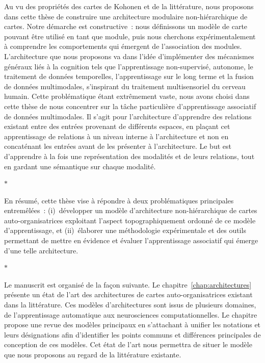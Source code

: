 Au vu des propriétés des cartes de Kohonen et de la littérature, nous proposons dans cette thèse de construire une architecture modulaire non-hiérarchique de cartes.
Notre démarche est constructive~: nous définissons un modèle de carte pouvant être utilisé en tant que module, puis nous cherchons expérimentalement à comprendre les comportements qui émergent de l'association des modules.
L'architecture que nous proposons va dans l'idée d'implémenter des mécanismes généraux liés à la cognition tels que l'apprentissage non-supervisé, autonome, le traitement de données temporelles, l'apprentissage sur le long terme et la fusion de données multimodales, s'inspirant du traitement multisensoriel du cerveau humain.
Cette problématique étant extrêmement vaste, nous avons choisi dans cette thèse de nous concentrer sur la tâche particulière d'apprentissage associatif de données multimodales. 
Il s'agit pour l'architecture d'apprendre des relations existant entre des entrées provenant de différents espaces, en plaçant cet apprentissage de relations à un niveau interne à l'architecture et non en concaténant les entrées avant de les présenter à l'architecture. Le but est d'apprendre à la fois une représentation des modalités et de leurs relations, tout en gardant une sémantique sur chaque modalité.

\begin{center}
  $\ast$
\end{center}

En résumé, cette thèse vise à répondre à deux problématiques principales entremêlées~: (i)~développer un modèle d'architecture non-hiérarchique de cartes auto-organisatrices exploitant l'aspect topographiquement ordonné de ce modèle d'apprentissage, et (ii)~élaborer une méthodologie expérimentale et des outils permettant de mettre en évidence et évaluer l'apprentissage associatif qui émerge d'une telle architecture.

\begin{center}
  $\ast$
\end{center}

Le manuscrit est organisé de la façon suivante.
Le chapitre~\ref{chap:architectures} présente un état de l'art des architectures de cartes auto-organisatrices existant dans la littérature. Ces modèles d'architectures sont issus de plusieurs domaines, de l'apprentissage automatique aux neurosciences computationnelles.
Le chapitre propose une revue des modèles principaux en s'attachant à unifier les notations et leurs désignations afin d'identifier les points communs et différences principales de conception de ces modèles.
Cet état de l'art nous permettra de situer le modèle que nous proposons au regard de la littérature existante.

